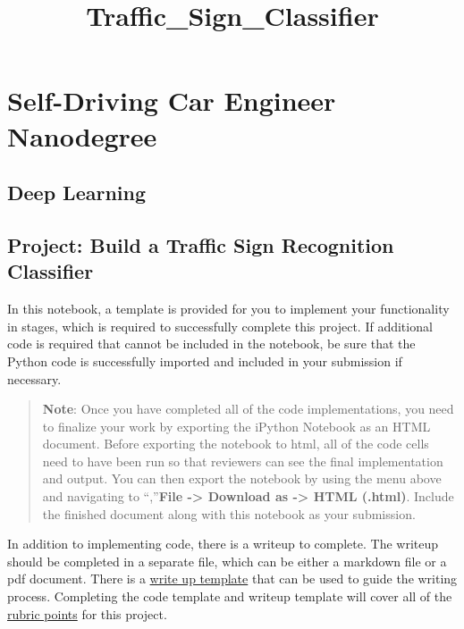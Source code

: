 \documentclass[11pt]{article}
\title{Traffic\_Sign\_Classifier}
\begin{document}
    
    
    \maketitle
    
    

    
    \hypertarget{self-driving-car-engineer-nanodegree}{%
\section{Self-Driving Car Engineer
Nanodegree}\label{self-driving-car-engineer-nanodegree}}

\hypertarget{deep-learning}{%
\subsection{Deep Learning}\label{deep-learning}}

\hypertarget{project-build-a-traffic-sign-recognition-classifier}{%
\subsection{Project: Build a Traffic Sign Recognition
Classifier}\label{project-build-a-traffic-sign-recognition-classifier}}

In this notebook, a template is provided for you to implement your
functionality in stages, which is required to successfully complete this
project. If additional code is required that cannot be included in the
notebook, be sure that the Python code is successfully imported and
included in your submission if necessary.

\begin{quote}
\textbf{Note}: Once you have completed all of the code implementations,
you need to finalize your work by exporting the iPython Notebook as an
HTML document. Before exporting the notebook to html, all of the code
cells need to have been run so that reviewers can see the final
implementation and output. You can then export the notebook by using the
menu above and navigating to \n``,''\textbf{File -\textgreater{}
Download as -\textgreater{} HTML (.html)}. Include the finished document
along with this notebook as your submission.
\end{quote}

In addition to implementing code, there is a writeup to complete. The
writeup should be completed in a separate file, which can be either a
markdown file or a pdf document. There is a
\href{https://github.com/udacity/CarND-Traffic-Sign-Classifier-Project/blob/master/writeup_template.md}{write
up template} that can be used to guide the writing process. Completing
the code template and writeup template will cover all of the
\href{https://review.udacity.com/\#!/rubrics/481/view}{rubric points}
for this project.
\end{document}
